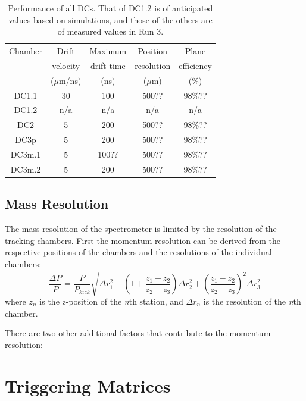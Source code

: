 \begin{table}[bthp]\centering
  \caption{Performance of all DCs.
    That of DC1.2 is of anticipated values based on simulations,
    and those of the others are of measured values in Run 3.}
  \label{tab:cham:performance2}
  \begin{tabular}{c|cccc}
    \hline
    Chamber & Drift       & Maximum    & Position   & Plane \\
            & velocity    & drift time & resolution & efficiency \\
            & ($\mu$m/ns) & (ns)       & ($\mu$m)   & (\%) \\ 
    \hline
    DC1.1   &    30       &     100    &   500??    & 98\%?? \\
    DC1.2   &    n/a      &     n/a    &   n/a      & n/a    \\
    DC2     &     5       &     200    &   500??    & 98\%?? \\
    DC3p    &     5       &     200    &   500??    & 98\%?? \\
    DC3m.1  &     5       &     100??  &   500??    & 98\%?? \\
    DC3m.2  &     5       &     200    &   500??    & 98\%?? \\
    \hline
  \end{tabular}
\end{table}

\subsection{Mass Resolution}

The mass resolution of the spectrometer is limited by the resolution of the tracking chambers.
First the momentum resolution can be derived from the respective positions of the chambers and the
resolutions of the individual chambers:
\begin{equation}
\frac{\Delta P}{P} = \frac{P}{P_{kick}} \sqrt{\Delta r_1 ^2 + \left( 1 + \frac{z_1 - z_2}{z_2 - z_3} \right) \Delta r_2^2 +
	\left( \frac{z_1 - z_2}{z_2 - z_3} \right)^2 \Delta r_3^2 }
\end{equation}
where $z_n$ is the z-position of the \emph{n}th station, and $\Delta r_n$ is
the resolution of the \emph{n}th chamber.

There are two other additional factors that contribute to the momentum resolution: 


\section{Triggering Matrices}

